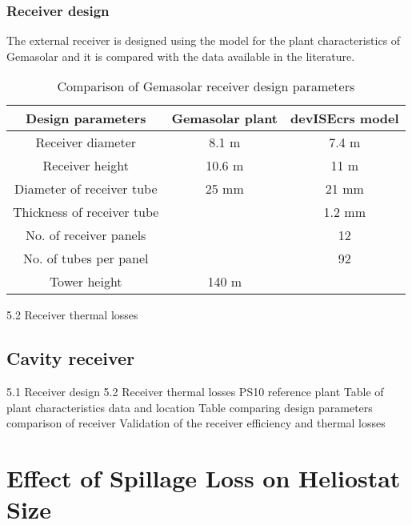 \subsubsection{Receiver design}
The external receiver is designed using the model for the plant characteristics of Gemasolar and it is compared with the data available in the literature. 
\begin{table}[h!]
	\begin{center}
		\begin{tabular}{ |c|c|c|} 
			\hline
			\textbf{Design parameters} & \textbf{Gemasolar plant} & \textbf{devISEcrs model} \\
			\hline
			Receiver diameter & 8.1 m & 7.4 m\\
			\hline
			Receiver height & 10.6 m & 11 m \\
			\hline
			Diameter of receiver tube & 25 mm & 21 mm\\
			\hline
			Thickness of receiver tube & & 1.2 mm \\
			\hline
			No. of receiver panels & & 12\\
			\hline
			No. of tubes per panel & & 92\\
			\hline
			Tower height & 140 m  & \\
			\hline
		\end{tabular}
		\caption{Comparison of Gemasolar receiver design parameters}
		\label{Gemasolar plant characteristics}
	\end{center}
\end{table}
5.2 Receiver thermal losses

\subsection{Cavity receiver}
5.1 Receiver design
5.2 Receiver thermal losses
PS10 reference plant
Table of plant characteristics data and location
Table comparing design parameters comparison of receiver
Validation of the receiver efficiency and thermal losses
\section{Effect of Spillage Loss on Heliostat Size}